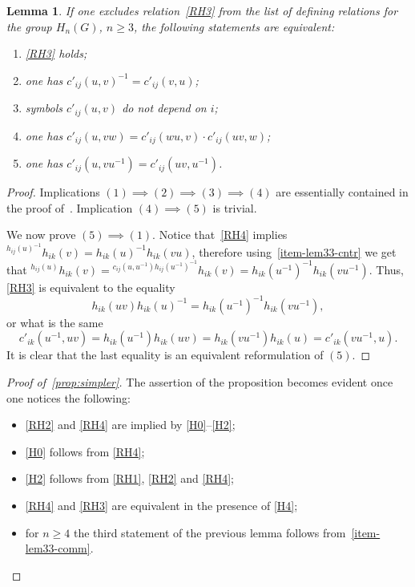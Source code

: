 \documentclass[oneside, 10pt]{amsart}
\theoremstyle{plain}
\numberwithin{equation}{section}
\newtheorem{lemma}{Lemma}
\numberwithin{lemma}{section}
\theoremstyle{remark}
\theoremstyle{definition}
\begin{document}
\begin{lemma}
If one excludes relation~\eqref{RH3} from the list of defining relations for the group $H_n(G)$, $n\geq 3$, the following statements are equivalent:
\begin{enumerate}
\item \label{item1} \eqref{RH3} holds;
\item \label{item4} one has $c'_{ij}(u, v)^{-1} = c'_{ij}(v, u)$;
\item \label{item5} symbols $c'_{ij}(u, v)$ do not depend on $i$;
\item \label{item5} one has $c'_{ij}(u, vw) = c'_{ij}(wu, v) \cdot c'_{ij}(uv, w)$;
\item \label{item6} one has $c'_{ij}(u, vu^{-1}) = c'_{ij}(uv, u^{-1})$.
\end{enumerate}
\end{lemma}
\begin{proof}
Implications $(1) \implies (2) \implies (3) \implies (4)$ are essentially contained in the proof of~\cite[Lemmas~2.1-2.2]{Reh78}.
Implication $(4) \implies (5)$ is trivial.

We now prove $(5) \implies (1)$. Notice that~\eqref{RH4} implies ${}^{h_{ij}(u)^{-1}}h_{ik}(v) = h_{ik}(u)^{-1} h_{ik}(vu)$, therefore
using~\cref{item-lem33-cntr} we get that ${}^{h_{ij}(u)}h_{ik}(v) = {}^{c_{ij}(u, u^{-1}) h_{ij}(u^{-1})^{-1}}h_{ik}(v) = h_{ik}(u^{-1})^{-1} h_{ik}(vu^{-1}).$
Thus, \eqref{RH3} is equivalent to the equality 
\[ h_{ik}(uv) h_{ik}(u)^{-1} = h_{ik}(u^{-1})^{-1} h_{ik}(vu^{-1}),\]
or what is the same
\[c'_{ik}(u^{-1}, uv) = h_{ik}(u^{-1}) h_{ik}(uv) =  h_{ik}(vu^{-1}) h_{ik}(u) = c'_{ik}(vu^{-1}, u).\]
It is clear that the last equality is an equivalent reformulation of $(5)$.
\end{proof}

\begin{proof}[Proof of~\cref{prop:simpler}]
The assertion of the proposition becomes evident once one notices the following:
\begin{itemize}
 \item \eqref{RH2} and \eqref{RH4} are implied by \eqref{H0}--\eqref{H2};
 \item \eqref{H0} follows from \eqref{RH4};
 \item \eqref{H2} follows from \eqref{RH1}, \eqref{RH2} and \eqref{RH4};
 \item \eqref{RH4} and \eqref{RH3} are equivalent in the presence of \eqref{H4};
 \item for $n\geq 4$ the third statement of the previous lemma follows from~\cref{item-lem33-comm}.
\end{itemize}
\end{proof}
\end{document}
